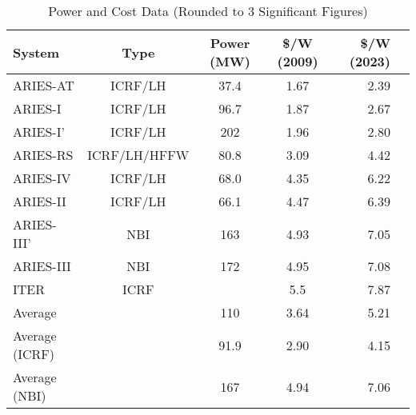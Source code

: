 \begin{table}[htbp]
    \centering
   
    \begin{tabular}{lcccrr}
        \hline
        System & Type & Power (MW) & \$/W (2009) & \$/W (2023) \\
        \hline
        ARIES-AT & ICRF/LH & 37.4 & 1.67 & 2.39 \\
        ARIES-I & ICRF/LH & 96.7 & 1.87 & 2.67 \\
        ARIES-I' & ICRF/LH & 202 & 1.96 & 2.80 \\
        ARIES-RS & ICRF/LH/HFFW & 80.8 & 3.09 & 4.42 \\
        ARIES-IV & ICRF/LH & 68.0 & 4.35 & 6.22 \\
        ARIES-II & ICRF/LH & 66.1 & 4.47 & 6.39 \\
        ARIES-III' & NBI & 163 & 4.93 & 7.05 \\
        ARIES-III & NBI & 172 & 4.95 & 7.08 \\
        ITER & ICRF & & 5.5 & 7.87 \\
        Average &  & 110 & 3.64 & 5.21 \\
        Average (ICRF) &  & 91.9 & 2.90 & 4.15 \\
        Average (NBI) &  & 167 & 4.94 & 7.06 \\
        \hline
    \end{tabular}
     \caption{Power and Cost Data (Rounded to 3 Significant Figures)}
    \label{tab:supp_heat}
\end{table}

